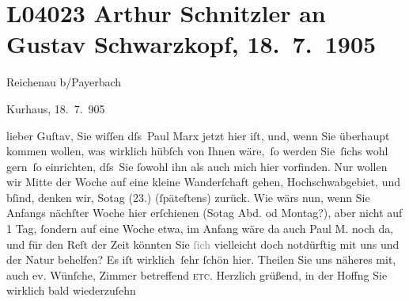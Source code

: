 

\section[Arthur Schnitzler an Gustav Schwarzkopf, 18. 7. 1905]{L04023 Arthur Schnitzler an Gustav Schwarzkopf, 18. 7. 1905}
\nopagebreak{}
\rehead{ }\normalsize\beginnumbering{}
\toendnotes[C]{\smallbreak\pagebreak[2]}
\toendnotes[C]{\smallbreak}
\toendnotes[C]{\smallbreak}
\pstart
           \raggedleft{}{\pb}Reichenau b/Payerbach\pend
           
\pstart
           \raggedleft{}Kurhaus,
                     18. 7. 905\pend
           
\pstart{}lieber Guſtav,\pend\vspace{0.5em}
\pstart
           Sie wiſſen dſs Paul Marx jetzt hier iſt, und,
               wenn Sie überhaupt kommen wollen, was wirklich hübſch von Ihnen wäre, ſo werden
               Sie ſichs wohl gern ſo einrichten, dſs Sie{ }ſowohl ihn als auch mich hier vorfinden.
               Nur wollen wir Mitte der Woche auf eine kleine Wanderſchaft {\pb}gehen, Hochschwabgebiet, und bſind, denken wir, So{\geminationn}tag{ }\introOben{}(23.)\introOben{} (ſpäteſtens) zurück. Wie wärs nun, wenn Sie
               Anfangs nächſter Woche hier erſchienen \introOben{}(So{\geminationn}tag Abd. od Montag?)\introOben{}, aber nicht auf 1 Tag,{ }ſondern auf eine Woche etwa, im Anfang wäre da{\geminationn} auch Paul M. noch da, und für den Reſt der Zeit
               könnten Sie \textcolor{gray}{ſich} vielleicht doch notdürftig mit uns und der Natur
               behelfen? Es iſt wirklich ſehr {\pb}ſchön
               hier. Theilen Sie uns näheres mit, auch ev. Wünſche, Zimmer betreffend \textsc{etc.} Herzlich grüßend, in der Hoffng Sie wirklich bald
               wiederzuſehn\pend
           
